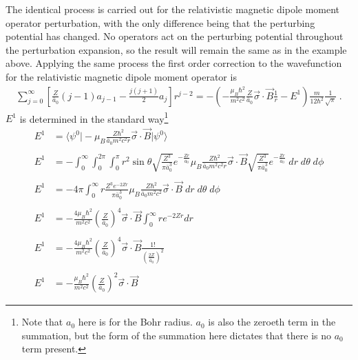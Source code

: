     The identical process is carried out for the relativistic magnetic dipole moment operator perturbation, with the only difference being that the perturbing potential has changed. No operators act on the perturbing potential throughout the perturbation expansion, so the result will remain the same as in the example above. Applying the same process the first order correction to the wavefunction for the relativistic magnetic dipole moment operator is 
    \begin{align}
        \sum_{j = 0}^\infty \left[ \frac{Z}{\bar{a}_0}(j-1)a_{j-1} - \frac{j(j+1)}{2} a_j \right] r^{j-2} = -\left(- \frac{\mu_B \hbar^2}{m^2c^2} \frac{Z}{\bar{a}_0} \vec{\sigma} \cdot \vec{B} \frac{1}{r} - E^1 \right) \frac{m}{12 \hbar^2}\frac{1}{\sqrt{\pi}}\;.
    \end{align}
    \noindent $E^1$ is determined in the standard way\footnote{Note that $a_0$ here is for the Bohr radius. $a_0$ is also the zeroeth term in the summation, but the form of the summation here dictates that there is no $a_0$ term present.}
    \begin{align*}
        E^1 &= \langle \psi^0 \vert - \mu_B \frac{Z \hbar^2}{\bar{a}_0 m^2 c^2 r} \vec{\sigma} \cdot \vec{B} \vert \psi^0 \rangle \\ \nonumber \\
        E^1 &= -\int_0^\infty \int_0^{2\pi} \int_0^\pi r^2 \sin \theta \sqrt{\frac{Z^3}{\pi \bar{a}_0^3}} e^{-\frac{Zr}{\bar{a}_0}} \mu_B \frac{Z \hbar^2}{\bar{a}_0 m^2 c^2 r} \vec{\sigma} \cdot \vec{B} \sqrt{\frac{Z^3}{\pi \bar{a}_0^3}} e^{-\frac{Zr}{\bar{a}_0}}\;dr\;d\theta\;d\phi  \\\nonumber \\
        E^1 &= -4\pi \int_0^\infty r \frac{Z^3 e^{-2Zr}}{\pi \bar{a}_0^3} \mu_B \frac{Z \hbar^2}{\bar{a}_0 m^2 c^2} \vec{\sigma} \cdot \vec{B} \;dr\;d\theta\;d\phi\\\nonumber\\
        E^1 &= - \frac{4 \mu_B \hbar^2}{m^2 c^2} \left(\frac{Z}{\bar{a}_0} \right)^4\vec{\sigma} \cdot \vec{B} \int_0^\infty r e^{-2Zr} dr \\\nonumber \\
        E^1 &= - \frac{4 \mu_B \hbar^2}{m^2 c^2} \left(\frac{Z}{\bar{a}_0} \right)^4\vec{\sigma} \cdot \vec{B} \frac{1!}{(\frac{2Z}{\bar{a}_0})^2} \\\nonumber \\
        E^1 &= - \frac{\mu_B \hbar^2}{m^2 c^2} \left(\frac{Z}{\bar{a}_0} \right)^2\vec{\sigma} \cdot \vec{B}
    \end{align*}
